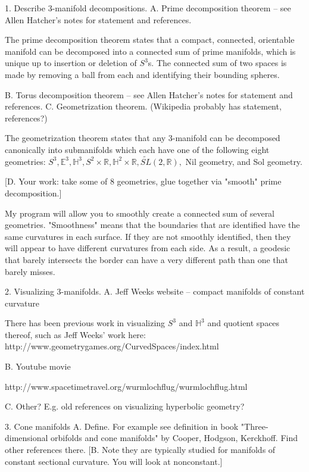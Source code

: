\documentclass[12pt]{amsart}
\begin{document}
1.  Describe 3-manifold decompositions.
  A.  Prime decomposition theorem -- see Allen Hatcher's notes for statement and references.

The prime decomposition theorem states that a compact, connected, orientable manifold can be decomposed into a connected sum of prime manifolds, which is unique up to insertion or deletion of $S^3$s. The connected sum of two spaces is made by removing a ball from each and identifying their bounding spheres.
  
  B.  Torus decomposition theorem -- see Allen Hatcher's notes for statement and references.
  C.  Geometrization theorem.  (Wikipedia probably has statement, references?)

The geometrization theorem states that any 3-manifold can be decomposed canonically into submanifolds which each have one of the following eight geometries: $S^3, \mathbb{E}^3, \mathbb{H}^3, S^2 \times \mathbb{R}, \mathbb{H}^2 \times \mathbb{R}, \tilde{SL}(2,\mathbb{R}),$ Nil geometry, and Sol geometry.


  [D.  Your work:  take some of 8 geometries, glue together via "smooth" prime decomposition.]

My program will allow you to smoothly create a connected sum of several geometries. "Smoothness" means that the boundaries that are identified have the same curvatures in each surface. If they are not smoothly identified, then they will appear to have different curvatures from each side. As a result, a geodesic that barely intersects the border can have a very different path than one that barely misses.



2.  Visualizing 3-manifolds.
  A.  Jeff Weeks website -- compact manifolds of constant curvature

There has been previous work in visualizing $S^3$ and $\mathbb{H}^3$ and quotient spaces thereof, such as Jeff Weeks' work here: http://www.geometrygames.org/CurvedSpaces/index.html

  B.  Youtube movie

http://www.spacetimetravel.org/wurmlochflug/wurmlochflug.html

  C.  Other?  E.g. old references on visualizing hyperbolic geometry?

3.  Cone manifolds
  A.  Define.  For example see definition in book "Three-dimensional orbifolds and cone manifolds" by Cooper, Hodgson, Kerckhoff.  Find other references there.
  [B.  Note they are typically studied for manifolds of constant sectional curvature.  You will look at nonconstant.]
\end{document}
